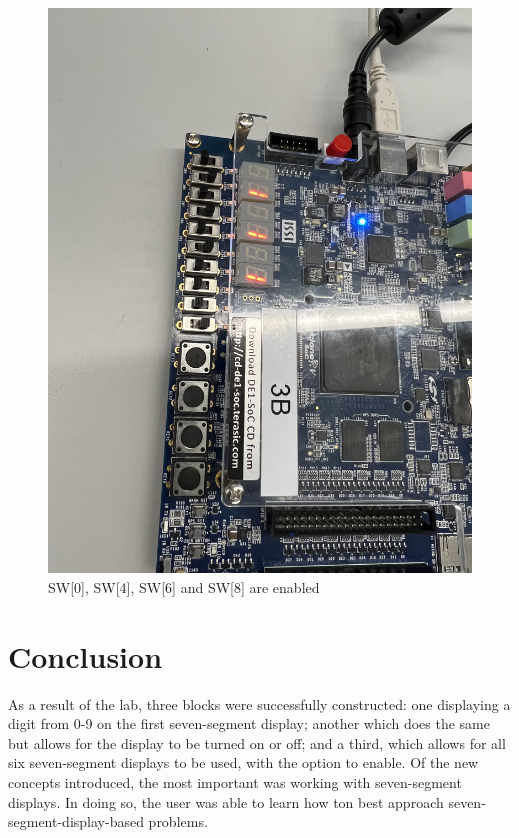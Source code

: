 \documentclass[
	letterpaper, %
	10pt, %
]{CSUniSchoolLabReport}
\begin{document}
\begin{figure}[H]
  \centering
  \includegraphics[width=.9\textwidth]{Figures/Three1.jpg}
  \caption{SW[0], SW[4], SW[6] and SW[8] are enabled}
  \label{fig:19}
\end{figure}

\section{Conclusion}

\hspace{.5 in} As a result of the lab, three blocks were successfully constructed: one displaying a digit from 0-9 on the first seven-segment display; another which does the same but allows for the display to be turned on or off; and a third, which allows for all six seven-segment displays to be used, with the option to enable. Of the new concepts introduced, the most important was working with seven-segment displays. In doing so, the user was able to learn how ton best approach seven-segment-display-based problems. 
\end{document}
